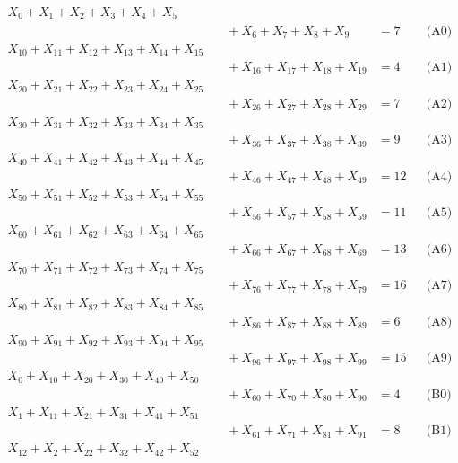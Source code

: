 \documentclass[a4paper,10pt]{article}
\begin{document}
\allowdisplaybreaks
{\small\begin{align}
X_{0} + X_{1} + X_{2} + X_{3} + X_{4} + X_{5} \\[0.5ex]
&\quad  + X_{6} + X_{7} + X_{8} + X_{9} &= 7 && \text{(A0)} \\
X_{10} + X_{11} + X_{12} + X_{13} + X_{14} + X_{15} \\[0.5ex]
&\quad  + X_{16} + X_{17} + X_{18} + X_{19} &= 4 && \text{(A1)} \\
X_{20} + X_{21} + X_{22} + X_{23} + X_{24} + X_{25} \\[0.5ex]
&\quad  + X_{26} + X_{27} + X_{28} + X_{29} &= 7 && \text{(A2)} \\
X_{30} + X_{31} + X_{32} + X_{33} + X_{34} + X_{35} \\[0.5ex]
&\quad  + X_{36} + X_{37} + X_{38} + X_{39} &= 9 && \text{(A3)} \\
X_{40} + X_{41} + X_{42} + X_{43} + X_{44} + X_{45} \\[0.5ex]
&\quad  + X_{46} + X_{47} + X_{48} + X_{49} &= 12 && \text{(A4)} \\
X_{50} + X_{51} + X_{52} + X_{53} + X_{54} + X_{55} \\[0.5ex]
&\quad  + X_{56} + X_{57} + X_{58} + X_{59} &= 11 && \text{(A5)} \\
X_{60} + X_{61} + X_{62} + X_{63} + X_{64} + X_{65} \\[0.5ex]
&\quad  + X_{66} + X_{67} + X_{68} + X_{69} &= 13 && \text{(A6)} \\
X_{70} + X_{71} + X_{72} + X_{73} + X_{74} + X_{75} \\[0.5ex]
&\quad  + X_{76} + X_{77} + X_{78} + X_{79} &= 16 && \text{(A7)} \\
X_{80} + X_{81} + X_{82} + X_{83} + X_{84} + X_{85} \\[0.5ex]
&\quad  + X_{86} + X_{87} + X_{88} + X_{89} &= 6 && \text{(A8)} \\
X_{90} + X_{91} + X_{92} + X_{93} + X_{94} + X_{95} \\[0.5ex]
&\quad  + X_{96} + X_{97} + X_{98} + X_{99} &= 15 && \text{(A9)} \\
X_{0} + X_{10} + X_{20} + X_{30} + X_{40} + X_{50} \\[0.5ex]
&\quad  + X_{60} + X_{70} + X_{80} + X_{90} &= 4 && \text{(B0)} \\
X_{1} + X_{11} + X_{21} + X_{31} + X_{41} + X_{51} \\[0.5ex]
&\quad  + X_{61} + X_{71} + X_{81} + X_{91} &= 8 && \text{(B1)} \\
X_{12} + X_{2} + X_{22} + X_{32} + X_{42} + X_{52} \\[0.5ex]

\end{align}}
\end{document}
